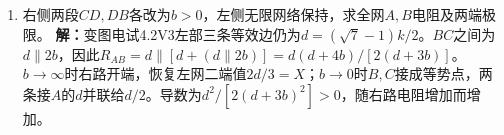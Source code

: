 \documentclass[UTF8,fontset=fandol,a4paper,11pt]{ctexart}
\begin{document}
\begin{enumerate}
\item 右侧两段$CD,DB$各改为$b>0$，左侧无限网络保持，求全网$A,B$电阻及两端极限。
\textbf{解：}变图电试4.2V3左部三条等效边仍为$d=(\sqrt7-1)k/2$。$BC$之间为$d\parallel2b$，因此$R_{AB}=d\parallel[d+(d\parallel2b)]=d(d+4b)/[2(d+3b)]$。$b\to\infty$时右路开端，恢复左网二端值$2d/3=X$；$b\to0$时$B,C$接成等势点，两条接$A$的$d$并联给$d/2$。导数为$d^2/[2(d+3b)^2]>0$，随右路电阻增加而增加。
\begin{center}\begin{minipage}{.98\linewidth}\centering
{}
\end{minipage}
\end{center}
\end{enumerate}
\end{document}
